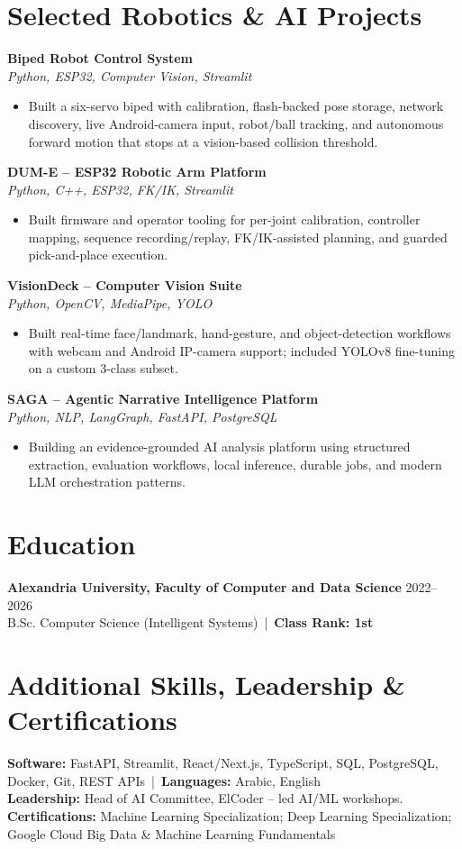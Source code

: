 \documentclass[letterpaper]{article}
\newcommand{\projectheader}[2]{\textbf{#1} \\\textit{#2} \\}
\begin{document}
\section*{Selected Robotics \& AI Projects}
\projectheader{Biped Robot Control System}{Python, ESP32, Computer Vision, Streamlit}
\begin{itemize}
\item Built a six-servo biped with calibration, flash-backed pose storage, network discovery, live Android-camera input, robot/ball tracking, and autonomous forward motion that stops at a vision-based collision threshold.
\end{itemize}
\projectheader{DUM-E -- ESP32 Robotic Arm Platform}{Python, C++, ESP32, FK/IK, Streamlit}
\begin{itemize}
\item Built firmware and operator tooling for per-joint calibration, controller mapping, sequence recording/replay, FK/IK-assisted planning, and guarded pick-and-place execution.
\end{itemize}
\projectheader{VisionDeck -- Computer Vision Suite}{Python, OpenCV, MediaPipe, YOLO}
\begin{itemize}
\item Built real-time face/landmark, hand-gesture, and object-detection workflows with webcam and Android IP-camera support; included YOLOv8 fine-tuning on a custom 3-class subset.
\end{itemize}
\projectheader{SAGA -- Agentic Narrative Intelligence Platform}{Python, NLP, LangGraph, FastAPI, PostgreSQL}
\begin{itemize}
\item Building an evidence-grounded AI analysis platform using structured extraction, evaluation workflows, local inference, durable jobs, and modern LLM orchestration patterns.
\end{itemize}

\section*{Education}
\textbf{Alexandria University, Faculty of Computer and Data Science} \hfill 2022--2026\\
B.Sc. Computer Science (Intelligent Systems) \,|\, \textbf{Class Rank: 1st}

\section*{Additional Skills, Leadership \& Certifications}
\textbf{Software:} FastAPI, Streamlit, React/Next.js, TypeScript, SQL, PostgreSQL, Docker, Git, REST APIs \,|\, \textbf{Languages:} Arabic, English\\
\textbf{Leadership:} Head of AI Committee, ElCoder -- led AI/ML workshops.\\
\textbf{Certifications:} Machine Learning Specialization; Deep Learning Specialization; Google Cloud Big Data \& Machine Learning Fundamentals
\end{document}
